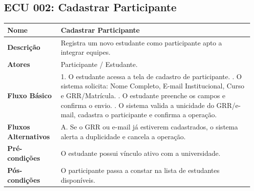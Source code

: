 \documentclass[12pt]{article}
\begin{document}
\subsection{ECU 002: Cadastrar Participante}
\begin{table}[H]
\centering
\small
\begin{tabular}{|p{3.2cm}|p{11.5cm}|}
\hline
\textbf{Nome} & Cadastrar Participante \\ \hline
\textbf{Descrição} & Registra um novo estudante como participante apto a integrar equipes. \\ \hline
\textbf{Atores} & Participante / Estudante. \\ \hline
\textbf{Fluxo Básico} & 
1. O estudante acessa a tela de cadastro de participante. \newline
2. O sistema solicita: Nome Completo, E-mail Institucional, Curso e GRR/Matrícula. \newline
3. O estudante preenche os campos e confirma o envio. \newline
4. O sistema valida a unicidade do GRR/e-mail, cadastra o participante e confirma a operação. \\ \hline
\textbf{Fluxos Alternativos} & 
A. Se o GRR ou e-mail já estiverem cadastrados, o sistema alerta a duplicidade e cancela a operação. \\ \hline
\textbf{Pré-condições} & O estudante possui vínculo ativo com a universidade. \\ \hline
\textbf{Pós-condições} & O participante passa a constar na lista de estudantes disponíveis. \\ \hline
\end{tabular}
\end{table}
\end{document}
